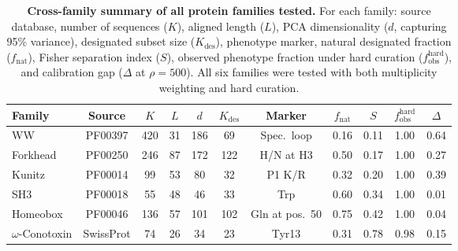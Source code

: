 \documentclass{article}
\theoremstyle{definition}
\theoremstyle{remark}
\begin{document}



\clearpage

\begin{table}[p]
  \centering
  \caption{\textbf{Cross-family summary of all protein families tested.}
  For each family: source database, number of sequences ($K$), aligned length ($L$), PCA
  dimensionality ($d$, capturing 95\% variance), designated subset size ($K_{\mathrm{des}}$),
  phenotype marker, natural designated fraction ($f_{\mathrm{nat}}$), Fisher separation index
  ($S$), observed phenotype fraction under hard curation ($f_{\mathrm{obs}}^{\mathrm{hard}}$),
  and calibration gap ($\Delta$ at $\rho=500$). All six families were tested with both
  multiplicity weighting and hard curation.}
  \label{tab:cross-family}
  \small
  \begin{tabular}{lcccccccccc}
    \toprule
    Family & Source & $K$ & $L$ & $d$ & $K_{\mathrm{des}}$ & Marker
           & $f_{\mathrm{nat}}$ & $S$
           & $f_{\mathrm{obs}}^{\mathrm{hard}}$ & $\Delta$ \\
    \midrule
    WW     & PF00397 & 420 & 31 & 186 & 69 & Spec.\ loop & 0.16 & 0.11 & 1.00 & 0.64 \\
    Forkhead & PF00250 & 246 & 87 & 172 & 122 & H/N at H3 & 0.50 & 0.17 & 1.00 & 0.27 \\
    Kunitz & PF00014 & 99  & 53 & 80  & 32 & P1 K/R  & 0.32 & 0.20 & 1.00 & 0.39 \\
    SH3    & PF00018 & 55  & 48 & 46  & 33 & Trp     & 0.60 & 0.34 & 1.00 & 0.01 \\
    Homeobox & PF00046 & 136 & 57 & 101 & 102 & Gln at pos.\ 50 & 0.75 & 0.42 & 1.00 & 0.04 \\
    \midrule
    $\omega$-Conotoxin & SwissProt & 74 & 26 & 34 & 23 & Tyr13 & 0.31 & 0.78 & 0.98 & 0.15 \\
    \bottomrule
  \end{tabular}
\end{table}
\end{document}
